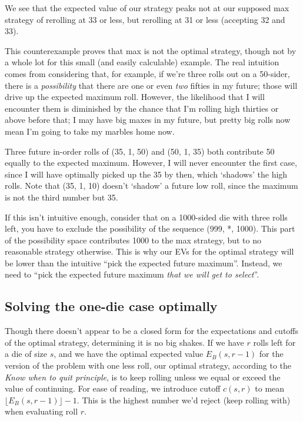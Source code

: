 \documentclass[11pt, oneside]{article} 	%
\begin{document}
We see that the expected value of our strategy peaks not at our supposed max strategy of rerolling at 33 or less, but rerolling at 31 or less (accepting 32 and 33).

This counterexample proves that max is not the optimal strategy, though not by a whole lot for this small (and easily calculable) example. The real intuition comes from considering that, for example, if we're three rolls out on a 50-sider, there is a \emph{possibility} that there are one or even \emph{two} fifties in my future; those will drive up the expected maximum roll. However, the likelihood that I will encounter them is diminished by the chance that I'm rolling high thirties or above before that; I may have big maxes in my future, but pretty big rolls now mean I'm going to take my marbles home now.

Three future in-order rolls of (35, 1, 50) and (50, 1, 35) both contribute 50 equally to the expected maximum. However, I will never encounter the first case, since I will have optimally picked up the 35 by then, which `shadows' the high rolls. Note that (35, 1, 10) doesn't `shadow' a future low roll, since the maximum is not the third number but 35.

If this isn't intuitive enough, consider that on a 1000-sided die with three rolls left, you have to exclude the possibility of the sequence (999, *, 1000). This part of the possibility space contributes 1000 to the max strategy, but to no reasonable strategy otherwise. This is why our EVs for the optimal strategy will be lower than the intuitive ``pick the expected future maximum''. Instead, we need to ``pick the expected future maximum \emph{that we will get to select}''.

\subsection{Solving the one-die case optimally}

Though there doesn't appear to be a closed form for the expectations and cutoffs of the optimal strategy, determining it is no big shakes. If we have $r$ rolls left for a die of size $s$, and we have the optimal expected value $E_B(s, r-1)$ for the version of the problem with one less roll, our optimal strategy, according to the \emph{Know when to quit principle}, is to keep rolling unless we equal or exceed the value of continuing. For ease of reading, we introduce cutoff $c(s,r)$ to mean $\lfloor E_B(s, r-1) \rfloor - 1$. This is the highest number we'd reject (keep rolling with) when evaluating roll $r$.
\end{document}

